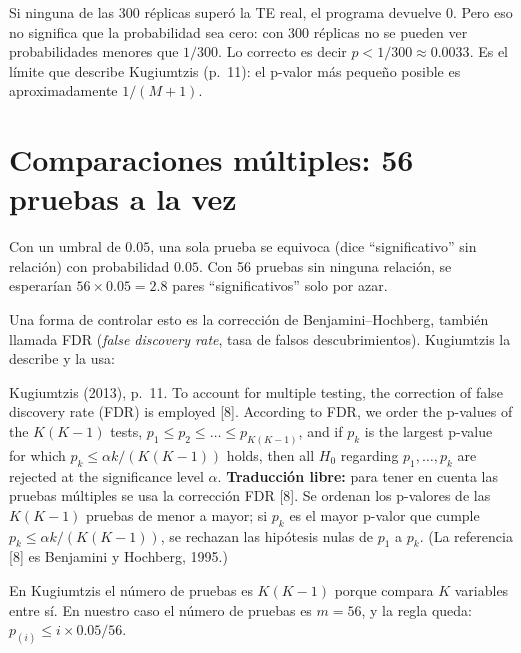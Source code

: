 \documentclass[11pt,openany]{book}
\begin{document}
\begin{nota}
Si ninguna de las 300 réplicas superó la TE real, el programa devuelve 0. Pero eso no significa que la probabilidad sea cero: con 300 réplicas no se pueden ver probabilidades menores que $1/300$. Lo correcto es decir $p < 1/300 \approx 0.0033$. Es el límite que describe Kugiumtzis (p.~11): el p-valor más pequeño posible es aproximadamente $1/(M+1)$.
\end{nota}

\section{Comparaciones múltiples: 56 pruebas a la vez}

\begin{nota}
Con un umbral de $0.05$, una sola prueba se equivoca (dice ``significativo'' sin relación) con probabilidad $0.05$. Con 56 pruebas sin ninguna relación, se esperarían $56 \times 0.05 = 2.8$ pares ``significativos'' solo por azar.
\end{nota}

Una forma de controlar esto es la corrección de Benjamini--Hochberg, también llamada FDR (\emph{false discovery rate}, tasa de falsos descubrimientos). Kugiumtzis la describe y la usa:

\begin{cita}{Kugiumtzis (2013), p.~11.}
To account for multiple testing, the correction of false discovery rate (FDR) is employed [8]. According to FDR, we order the p-values of the $K(K-1)$ tests, $p_1 \le p_2 \le \dots \le p_{K(K-1)}$, and if $p_k$ is the largest p-value for which $p_k \le \alpha k/(K(K-1))$ holds, then all $H_0$ regarding $p_1,\dots,p_k$ are rejected at the significance level $\alpha$.
\tcblower
\textbf{Traducción libre:} para tener en cuenta las pruebas múltiples se usa la corrección FDR [8]. Se ordenan los p-valores de las $K(K-1)$ pruebas de menor a mayor; si $p_k$ es el mayor p-valor que cumple $p_k \le \alpha k / (K(K-1))$, se rechazan las hipótesis nulas de $p_1$ a $p_k$. (La referencia [8] es Benjamini y Hochberg, 1995.)
\end{cita}

En Kugiumtzis el número de pruebas es $K(K-1)$ porque compara $K$ variables entre sí. En nuestro caso el número de pruebas es $m = 56$, y la regla queda: $p_{(i)} \le i \times 0.05 / 56$.
\end{document}
